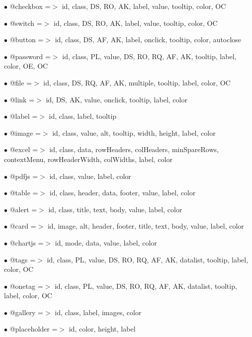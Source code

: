\documentclass[a4paper]{article}
\begin{document}
\begin{compactitem}
\item[\color{myblue}$\bullet$] @checkbox    =$>$ id, class, DS, RO, AK, label, value, tooltip, color, OC
\item[\color{myblue}$\bullet$] @switch      =$>$ id, class, DS, RO, AK, label, value, tooltip, color, OC
\item[\color{myblue}$\bullet$] @button      =$>$ id, class, DS, AF, AK, label, onclick, tooltip, color, autoclose
\item[\color{myblue}$\bullet$] @password    =$>$ id, class, PL, value, DS, RO, RQ, AF, AK, tooltip, label, color, OE, OC
\item[\color{myblue}$\bullet$] @file        =$>$ id, class, DS, RQ, AF, AK, multiple, tooltip, label, color, OC
\item[\color{myblue}$\bullet$] @link        =$>$ id, DS, AK, value, onclick, tooltip, label, color
\item[\color{myblue}$\bullet$] @label       =$>$ id, class, label, tooltip
\item[\color{myblue}$\bullet$] @image       =$>$ id, class, value, alt, tooltip, width, height, label, color
\item[\color{myblue}$\bullet$] @excel       =$>$ id, class, data, rowHeaders, colHeaders, minSpareRows, contextMenu, rowHeaderWidth,
                colWidths, label, color
\item[\color{myblue}$\bullet$] @pdfjs       =$>$ id, class, value, label, color
\item[\color{myblue}$\bullet$] @table       =$>$ id, class, header, data, footer, value, label, color
\item[\color{myblue}$\bullet$] @alert       =$>$ id, class, title, text, body, value, label, color
\item[\color{myblue}$\bullet$] @card        =$>$ id, image, alt, header, footer, title, text, body, value, label, color
\item[\color{myblue}$\bullet$] @chartjs     =$>$ id, mode, data, value, label, color
\item[\color{myblue}$\bullet$] @tags        =$>$ id, class, PL, value, DS, RO, RQ, AF, AK, datalist, tooltip, label, color, OC
\item[\color{myblue}$\bullet$] @onetag      =$>$ id, class, PL, value, DS, RO, RQ, AF, AK, datalist, tooltip, label, color, OC
\item[\color{myblue}$\bullet$] @gallery     =$>$ id, class, label, images, color
\item[\color{myblue}$\bullet$] @placeholder =$>$ id, color, height, label

\end{compactitem}
\end{document}
